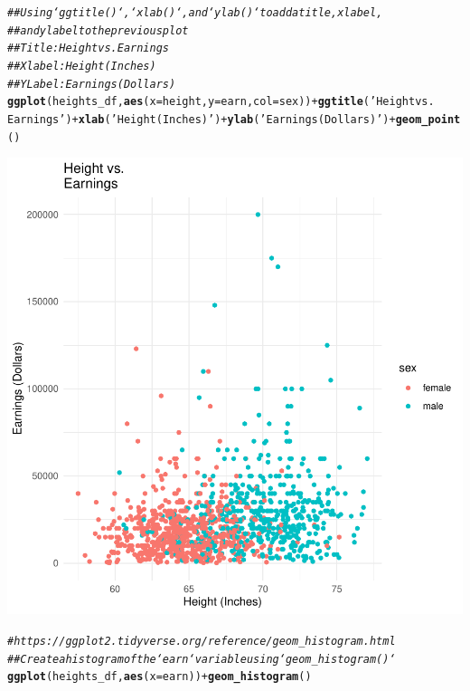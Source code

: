 \documentclass{article}\usepackage[]{graphicx}\usepackage[]{xcolor}
\makeatletter
\newcommand{\hlstr}[1]{\textcolor[rgb]{0.192,0.494,0.8}{#1}}%
\newcommand{\hlcom}[1]{\textcolor[rgb]{0.678,0.584,0.686}{\textit{#1}}}%
\newcommand{\hlopt}[1]{\textcolor[rgb]{0,0,0}{#1}}%
\newcommand{\hlstd}[1]{\textcolor[rgb]{0.345,0.345,0.345}{#1}}%
\newcommand{\hlkwc}[1]{\textcolor[rgb]{0.333,0.667,0.333}{#1}}%
\newcommand{\hlkwd}[1]{\textcolor[rgb]{0.737,0.353,0.396}{\textbf{#1}}}%
\newenvironment{kframe}{%
 \def\at@end@of@kframe{}%
 \ifinner\ifhmode%
  \def\at@end@of@kframe{\end{minipage}}%
  \begin{minipage}{\columnwidth}%
 \fi\fi%
 \def\FrameCommand##1{\hskip\@totalleftmargin \hskip-\fboxsep
 \colorbox{shadecolor}{##1}\hskip-\fboxsep
     \hskip-\linewidth \hskip-\@totalleftmargin \hskip\columnwidth}%
 \MakeFramed {\advance\hsize-\width
   \@totalleftmargin\z@ \linewidth\hsize
   \@setminipage}}%
 {\par\unskip\endMakeFramed%
 \at@end@of@kframe}
\newenvironment{knitrout}{}{} %
\makeatother
\begin{document}
\begin{knitrout}
{}


\begin{kframe}\begin{alltt}
\hlcom{## Using `ggtitle()`, `xlab()`, and `ylab()` to add a title, x label, }
\hlcom{##and y label to the previous plot}
\hlcom{## Title: Height vs. Earnings}
\hlcom{## X label: Height (Inches)}
\hlcom{## Y Label: Earnings (Dollars)}
\hlkwd{ggplot}\hlstd{(heights_df,} \hlkwd{aes}\hlstd{(}\hlkwc{x}\hlstd{=height,} \hlkwc{y}\hlstd{=earn,} \hlkwc{col}\hlstd{=sex))} \hlopt{+} \hlkwd{ggtitle}\hlstd{(}\hlstr{'Height vs. 
Earnings'}\hlstd{)} \hlopt{+} \hlkwd{xlab}\hlstd{(}\hlstr{'Height (Inches)'}\hlstd{)} \hlopt{+} \hlkwd{ylab}\hlstd{(}\hlstr{'Earnings (Dollars)'}\hlstd{)} \hlopt{+} \hlkwd{geom_point}\hlstd{()}
\end{alltt}
\end{kframe}

{\centering \includegraphics[width=.6\linewidth]{figure/assignment-03-Reppeto-Brian-Rnwauto-report-8} 

}


\begin{kframe}\begin{alltt}
\hlcom{# https://ggplot2.tidyverse.org/reference/geom_histogram.html}
\hlcom{## Create a histogram of the `earn` variable using `geom_histogram()`}
\hlkwd{ggplot}\hlstd{(heights_df,} \hlkwd{aes}\hlstd{(}\hlkwc{x}\hlstd{=earn))} \hlopt{+} \hlkwd{geom_histogram}\hlstd{()}
\end{alltt}


{\ttfamily\noindent\itshape\color{messagecolor}{\#\# `stat\_bin()` using `bins = 30`. Pick better value with `binwidth`.}}\end{kframe}


\end{knitrout}
\end{document}
